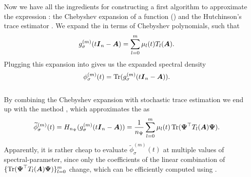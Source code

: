 Now we have all the ingredients for constructing a first algorithm to approximate
the expression :
the Chebyshev expansion of a function ()
and the Hutchinson's trace estimator .
We expand the  in terms of Chebyshev polynomials, such that
\begin{equation}
    g_{\sigma}^{(m)}(t\boldsymbol{I}_n - \boldsymbol{A}) = \sum_{l=0}^{m} \mu_l(t) T_l(\boldsymbol{A}).
    \label{equ:2-chebyshev-chebyshev-expansion}
\end{equation}
Plugging this expansion into 
gives us the expanded spectral density
\begin{equation}
    \phi_{\sigma}^{(m)}(t) = \operatorname{Tr}(g_{\sigma}^{(m)}(t\boldsymbol{I}_n - \boldsymbol{A})).
    \label{equ:2-chebyshev-spectral-density-as-trace-expansion}
\end{equation}\\

By combining the Chebyshev expansion 
with stochastic trace estimation
we end up with the  method \cite[algorithm~2]{lin2017randomized},
which approximates the  as
\begin{equation}
    \widetilde{\phi}_{\sigma}^{(m)}(t) = H_{n_{\Psi}}(g_{\sigma}^{(m)}(t\boldsymbol{I}_n - \boldsymbol{A})) = \frac{1}{n_{\Psi}} \sum_{l=0}^m \mu_l(t) \operatorname{Tr}(\boldsymbol{\Psi}^{\top} T_l(\boldsymbol{A}) \boldsymbol{\Psi}).
    \label{equ:2-chebyshev-DGC-final-estimator}
\end{equation}
Apparently, it is rather cheap to evaluate $\widetilde{\phi}_{\sigma}^{(m)}(t)$
at multiple values of \gls{spectral-parameter}, since only the coefficients
of the linear combination of $\{\operatorname{Tr}(\boldsymbol{\Psi}^{\top} T_l(\boldsymbol{A}) \boldsymbol{\Psi})\}_{l=0}^m$
change, which can be efficiently computed using .\\

